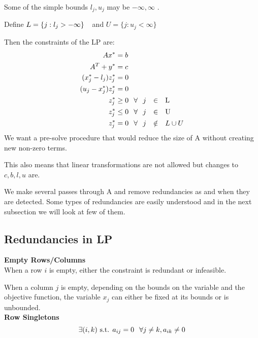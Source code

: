 \documentclass[twoside]{article}
\begin{document}
\begin{multicols}{2}
Some of the simple bounds $ l_j, u_j $ may be $ -\infty, \infty $ .

Define $L  = \{ j : l_j > -\infty\} \hspace{0.1in}$ and $U = \{ j : u_j < \infty\} $

Then the constraints of the LP are:
\begin{align*}
 Ax^* &= b \\
 A^T + y^* &= c \\
 (x_j^*-l_j)z_j^*& = 0 \\ 
 (u_j-x_j^*)z_j^*& = 0 \\
 z_j^* &\geq 0 \hspace{0.1in} \forall \hspace{0.1in} j \hspace{0.1in} \in \hspace{0.1in} \mbox{L} \\
 z_j^* &\leq 0 \hspace{0.1in} \forall \hspace{0.1in} j \hspace{0.1in} \in \hspace{0.1in} \mbox{U} \\
z_j^* &= 0 \hspace{0.1in} \forall \hspace{0.1in} j \hspace{0.1in} \notin \hspace{0.1in} L \cup U 
\end{align*}
We want a pre-solve procedure that would reduce the size of A without creating new non-zero terms. 

This also means that linear transformations are not allowed but changes to $c,b,l,u$ are.

We make several passes through A and remove redundancies as and when they are detected. Some types of redundancies are easily understood and in the next subsection we will look at few of them.
\vspace*{-\baselineskip}

\subsection{\textbf{Redundancies in LP}} 

\textbf{\color{blue}Empty Rows/Columns}\\When a row $i$ is empty, either the constraint is redundant or infeasible.
	
	When a column $j$ is empty, depending on the bounds on the variable and the objective function, the variable $x_j$ can either be fixed at its bounds or is unbounded. \\
\textbf{\color{blue}Row Singletons}
\begin{equation*}
 \exists (i,k) \text{ s.t. } a_{ij} = 0 \hspace{0.1in} \forall j \neq k, a_{ik} \neq 0    \end{equation*}
 

\end{multicols}
\end{document}
